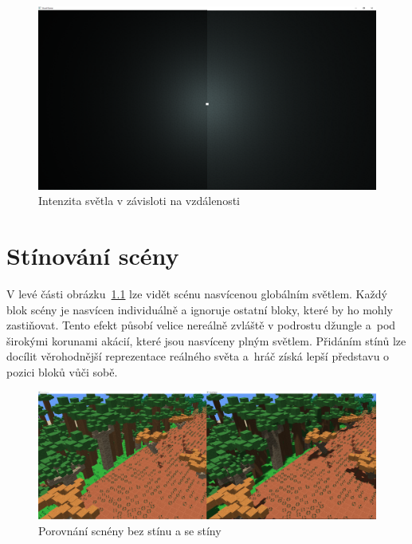 \documentclass[thesis=M,czech]{FITthesis}[2019/12/23]
\begin{document}
\begin{figure}\centering
	\includegraphics[width=\textwidth]{images/light}
	\caption[Intenzita světla v závisloti na vzdálenosti]{Intenzita světla v závisloti na vzdálenosti}\label{fig:light}
\end{figure}


\chapter{Stínování scény}

V levé části obrázku~\ref{fig:shadows_intro} lze vidět scénu nasvícenou globálním světlem. Každý blok scény je nasvícen individuálně a ignoruje ostatní bloky, které by ho mohly zastiňovat. Tento efekt působí velice nereálně zvláště v podrostu džungle a~pod širokými korunami akácií, které jsou nasvíceny plným světlem. Přidáním stínů lze docílit věrohodnější reprezentace reálného světa a~hráč získá lepší představu o pozici bloků vůči sobě.

\begin{figure}\centering
	\includegraphics[width=\textwidth]{images/shadows/intro}
	\caption[Porovnání scnény bez stínu a se stíny]{Porovnání scnény bez stínu a se stíny}\label{fig:shadows_intro}
\end{figure}
\end{document}
